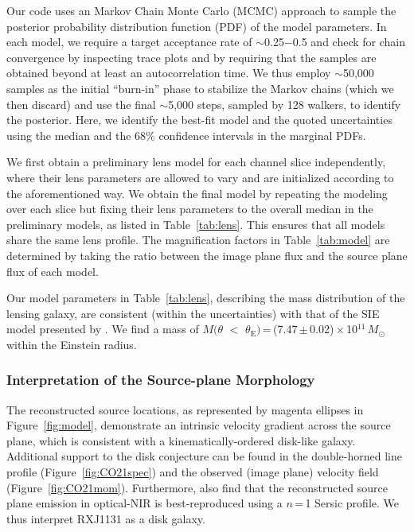 \documentclass[]{emulateapj}
\newcommand{\Msun}{\mbox{$M_{\odot}$}\xspace}
\newcommand{\Fig}[1]{Figure~\ref{fig:#1}}
\newcommand{\Tab}[1]{Table~\ref{tab:#1}}
\begin{document}
Our code uses an Markov Chain Monte Carlo (MCMC) approach to sample the
posterior probability distribution function (PDF) of the model parameters.
In each model, we require a target acceptance rate of $\sim$0.25$-$0.5
and check for chain convergence by inspecting trace plots
and by requiring that the samples are obtained beyond at least an autocorrelation time.
We thus employ $\sim$50,000 samples as the initial ``burn-in'' phase
to stabilize the Markov chains (which we then discard) and
use the final $\sim$5,000 steps, sampled by 128 walkers, to identify
the posterior. Here, we
identify the best-fit model and the quoted uncertainties using the
median and the 68\% confidence intervals in the marginal PDFs.

We first obtain a preliminary lens model for each channel slice independently,
where their lens parameters are allowed to vary and are initialized according
to the aforementioned way. We obtain the final model
by repeating the modeling over each slice but fixing their lens parameters
to the overall median in the preliminary models,
as listed in \Tab{lens}.
This ensures that all models share the same lens profile.
The magnification factors in \Tab{model} are determined by taking the ratio
between the image plane flux and the source plane flux of each model.

Our model parameters in \Tab{lens}, describing
the mass distribution of the lensing galaxy, are consistent (within the uncertainties)
with that of the SIE model presented by . We find a mass of
$M(\theta$\,\,$<$\,\,$\theta_\textrm{E})$\,=\,(7.47\,$\pm$\,0.02)\,$\times$\,10$^{11}$\,\Msun
within the Einstein radius.

\subsubsection{Interpretation of the Source-plane Morphology} \label{sec:caveat}
The reconstructed source locations, as represented by magenta ellipses in \Fig{model}, demonstrate
an intrinsic velocity gradient across the source plane, which is
consistent with a kinematically-ordered disk-like galaxy.
Additional support to the disk conjecture
can be found in the double-horned line profile (\Fig{CO21spec})
and the observed (image plane) velocity field (\Fig{CO21mom}). Furthermore,
 also find that the reconstructed source plane emission in optical-NIR
is best-reproduced using a $n$\,=\,1 Sersic profile.
We thus interpret RXJ1131 as a disk galaxy.
\end{document}
